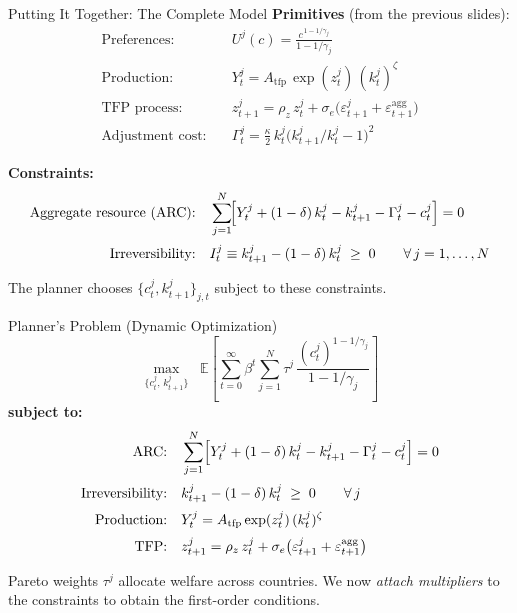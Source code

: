 \documentclass[aspectratio=169,11pt]{beamer}
\newcommand{\E}[1]{\mathbb{E}\!\left[#1\right]}
\begin{document}
\begin{frame}{Putting It Together: The Complete Model}
\footnotesize
\textbf{Primitives} (from the previous slides):
\begin{align*}
\text{Preferences:}   &\quad U^j(c) = \tfrac{c^{\,1 - 1/\gamma_j}}{1 - 1/\gamma_j} \\[1pt]
\text{Production:}    &\quad Y_t^j = A_{\mathrm{tfp}}\,\exp(z_t^j)\,(k_t^j)^{\zeta} \\[1pt]
\text{TFP process:}   &\quad z_{t+1}^j = \rho_z\, z_t^j + \sigma_e\bigl(\varepsilon_{t+1}^j + \varepsilon_{t+1}^{\mathrm{agg}}\bigr) \\[1pt]
\text{Adjustment cost:}&\quad \Gamma_t^j = \tfrac{\kappa}{2}\, k_t^j \bigl(k_{t+1}^j/k_t^j - 1\bigr)^{2}
\end{align*}

\textbf{Constraints:}
\begin{align*}
\text{Aggregate resource (ARC):} &\quad \sum_{j=1}^{N}\!\Bigl[ Y_t^j + (1-\delta)\, k_t^j - k_{t+1}^j - \Gamma_t^j - c_t^j \Bigr] = 0 \\[2pt]
\text{Irreversibility:} &\quad I_t^j \equiv k_{t+1}^j - (1-\delta)\, k_t^j \;\geq\; 0 \qquad \forall\, j = 1,\ldots,N
\end{align*}

\smallskip
The planner chooses $\{c_t^j, k_{t+1}^j\}_{j,t}$ subject to these constraints.
\end{frame}

\begin{frame}{Planner's Problem (Dynamic Optimization)}
\footnotesize
\[
\max_{\{c_t^j,\, k_{t+1}^j\}} \;\; \E{\sum_{t=0}^{\infty} \beta^{t} \sum_{j=1}^{N} \tau^j \, \frac{(c_t^j)^{1 - 1/\gamma_j}}{1 - 1/\gamma_j}}
\]
\textbf{subject to:}
\begin{align*}
\text{ARC:} &\quad \sum_{j=1}^{N} \Bigl[ Y_t^j + (1-\delta)\,k_t^j - k_{t+1}^j - \Gamma_t^j - c_t^j \Bigr] = 0 \\[2pt]
\text{Irreversibility:} &\quad k_{t+1}^j - (1-\delta)\,k_t^j \;\geq\; 0 \qquad \forall\, j \\[2pt]
\text{Production:} &\quad Y_t^j = A_{\mathrm{tfp}}\exp(z_t^j)\,(k_t^j)^{\zeta} \\[2pt]
\text{TFP:}         &\quad z_{t+1}^j = \rho_z\, z_t^j + \sigma_e\bigl(\varepsilon_{t+1}^j + \varepsilon_{t+1}^{\mathrm{agg}}\bigr)
\end{align*}

\smallskip
Pareto weights $\tau^j$ allocate welfare across countries. We now \emph{attach multipliers} to the constraints to obtain the first-order conditions.
\end{frame}
\end{document}
